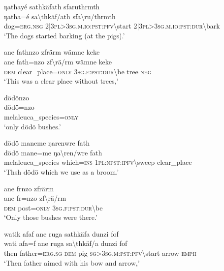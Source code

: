 \ea\label{ex:12:a739}
ŋathayé sathkäfath sfaruthrmth\\
\gll ŋatha=é	sa{\textbackslash}thkäf/ath	sfa{\textbackslash}ru/thrmth\\
     dog=\textsc{erg}.\textsc{nsg}	2|3\textsc{pl}>3\textsc{sg}.\textsc{m}.\textsc{io}:\textsc{pst}:\textsc{pfv}{\textbackslash}start	2|3\textsc{pl}>3\textsc{sg}.\textsc{m}.\textsc{io}:\textsc{pst}:\textsc{dur}{\textbackslash}bark\\
\glt `The dogs started barking (at the pigs).'
\z

\ea\label{ex:12:a741}
ane fathnzo zfrärm wämne keke\\
\gll ane	fath=nzo	zf{\textbackslash}rä/rm	wämne	keke\\
     \textsc{dem}	clear\_place=\textsc{only}	3\textsc{sg}.\textsc{f}:\textsc{pst}:\textsc{dur}{\textbackslash}be	tree	\textsc{neg}\\
\glt `This was a clear place without trees,'
\z

\ea\label{ex:12:a742}
dödönzo\\
\gll dödö=nzo\\
     melaleuca\_species=\textsc{only}\\
\glt `only dödö bushes.'
\z

\ea\label{ex:12:a743}
dödö maneme ŋarenwre fath\\
\gll dödö	mane=me	ŋa{\textbackslash}ren/wre	fath\\
     melaleuca\_species	which=\textsc{ins}	1\textsc{pl}:\textsc{npst}:\textsc{ipfv}{\textbackslash}sweep	clear\_place\\
\glt `Thsh dödö which we use as a broom.'
\z

\ea\label{ex:12:a744}
ane frnzo zfrärm\\
\gll ane	fr=nzo	zf{\textbackslash}rä/rm\\
     \textsc{dem}	post=\textsc{only}	3\textsc{sg}.\textsc{f}:\textsc{pst}:\textsc{dur}{\textbackslash}be\\
\glt `Only those bushes were there.'
\z

\ea\label{ex:12:a745}
watik afaf ane ruga sathkäfa dunzi fof\\
\gll wati	afa=f	ane	ruga	sa{\textbackslash}thkäf/a	dunzi	fof\\
     then	father=\textsc{erg}.\textsc{sg}	\textsc{dem}	pig	\textsc{sg}>3\textsc{sg}.\textsc{m}:\textsc{pst}:\textsc{pfv}{\textbackslash}start	arrow	\textsc{emph}\\
\glt `Then father aimed with his bow and arrow,'
\z


